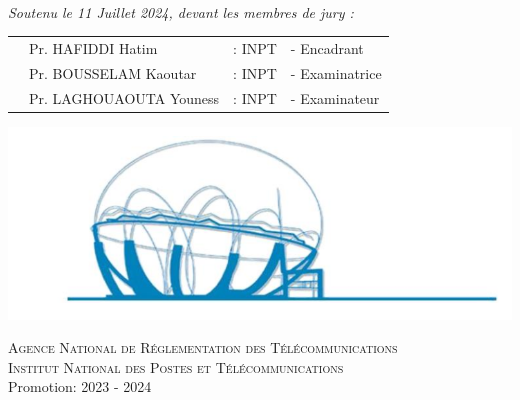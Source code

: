 \begin{titlepage}
\begin{minipage}{0.9\textwidth}
\begin{flushleft}
  \end{flushleft}
\end{minipage}

\begin{minipage}{0.4\textwidth}
\end{minipage}\\[0.2cm]
{\large \textit{Soutenu le 11 Juillet 2024, devant les membres de jury : }}\\[0.5cm]
\centering

\begin{tabular}{p{2.8cm}lll}
    & \large Pr. HAFIDDI Hatim & \large : INPT & \large - Encadrant \\[0.1cm]
    & \large Pr. BOUSSELAM Kaoutar  & \large : INPT & \large - Examinatrice  \\[0.1cm]
    & \large Pr. LAGHOUAOUTA Youness & \large : INPT & \large - Examinateur \\[0.1cm]
 
\end{tabular}




\includegraphics[scale=0.8]{Images/ZLAFA.png}


\textsc{Agence National de Réglementation des Télécommunications}\\
\textsc{Institut National des Postes et Télécommunications}\\
\vspace{0.5cm}
{\large Promotion: 2023 - 2024}

\end{titlepage}